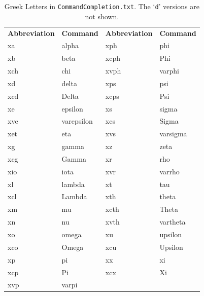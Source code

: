 \documentclass[11pt]{article}
\newcommand{\CCT}{\texttt{CommandCompletion.txt}}
\begin{document}
\begin{table}\small\centering
\begin{tabular}{llll}
\textbf{Abbreviation} & \textbf{Command} & \textbf{Abbreviation} & \textbf{Command} \\
\cmidrule[0.5pt](lr){1-1} \cmidrule[0.5pt](lr){2-2} \cmidrule[0.5pt](lr){3-3} \cmidrule[0.5pt](lr){4-4}
xa  & alpha      & xph  & phi \\
xb  & beta       & xcph & Phi \\
xch & chi        & xvph & varphi \\
xd  & delta      & xps  & psi \\
xcd & Delta      & xcps & Psi \\
xe  & epsilon    & xs   & sigma \\
xve & varepsilon & xcs  & Sigma \\
xet & eta        & xvs  & varsigma \\
xg  & gamma      & xz   & zeta \\
xcg & Gamma      & xr   & rho \\
xio & iota       & xvr  & varrho \\
xl  & lambda     & xt   & tau \\
xcl & Lambda     & xth  & theta \\
xm  & mu         & xcth & Theta \\
xn  & nu         & xvth & vartheta \\
xo  & omega      & xu   & upsilon \\
xco & Omega      & xcu  & Upsilon \\
xp  & pi         & xx   & xi \\
xcp & Pi         & xcx  & Xi \\
xvp & varpi      &      & \\
\end{tabular}
\caption{Greek Letters in \CCT. The `\texttt{d}' versions are not shown.}
\label{tbl:greek}
\end{table}
\end{document}

